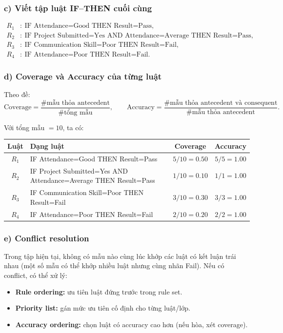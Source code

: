 \subsubsection*{c) Viết tập luật IF--THEN cuối cùng}
\[
\begin{aligned}
R_1&:\ \text{IF Attendance=Good THEN Result=Pass},\\
R_2&:\ \text{IF Project Submitted=Yes AND Attendance=Average THEN Result=Pass},\\
R_3&:\ \text{IF Communication Skill=Poor THEN Result=Fail},\\
R_4&:\ \text{IF Attendance=Poor THEN Result=Fail}.
\end{aligned}
\]

\subsubsection*{d) Coverage và Accuracy của từng luật}

Theo đề:
\[
\text{Coverage}=\frac{\#\text{mẫu thỏa antecedent}}{\#\text{tổng mẫu}},\qquad
\text{Accuracy}=\frac{\#\text{mẫu thỏa antecedent và consequent}}{\#\text{mẫu thỏa antecedent}}.
\]

Với tổng mẫu \(=10\), ta có:

\begin{center}
\begin{tabular}{@{}clcc@{}}
\toprule
Luật & Dạng luật & Coverage & Accuracy \\
\midrule
\(R_1\) & IF Attendance=Good THEN Result=Pass & \(5/10=0.50\) & \(5/5=1.00\) \\
\(R_2\) & IF Project Submitted=Yes AND Attendance=Average THEN Result=Pass & \(1/10=0.10\) & \(1/1=1.00\) \\
\(R_3\) & IF Communication Skill=Poor THEN Result=Fail & \(3/10=0.30\) & \(3/3=1.00\) \\
\(R_4\) & IF Attendance=Poor THEN Result=Fail & \(2/10=0.20\) & \(2/2=1.00\) \\
\bottomrule
\end{tabular}
\end{center}

\subsubsection*{e) Conflict resolution}

Trong tập hiện tại, không có mẫu nào cùng lúc khớp các luật có kết luận trái nhau
(một số mẫu có thể khớp nhiều luật nhưng cùng nhãn Fail).
Nếu có conflict, có thể xử lý:
\begin{itemize}
  \item \textbf{Rule ordering:} ưu tiên luật đứng trước trong rule set.
  \item \textbf{Priority list:} gán mức ưu tiên cố định cho từng luật/lớp.
  \item \textbf{Accuracy ordering:} chọn luật có accuracy cao hơn (nếu hòa, xét coverage).
\end{itemize}


